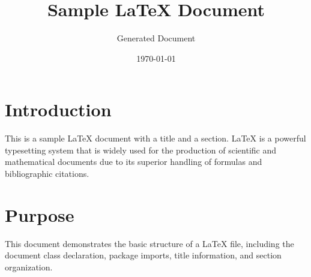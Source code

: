 \documentclass{article}
\title{Sample LaTeX Document}
\author{Generated Document}
\date{\today}
\begin{document}
\maketitle

\section{Introduction}
This is a sample LaTeX document with a title and a section. LaTeX is a powerful typesetting system that is widely used for the production of scientific and mathematical documents due to its superior handling of formulas and bibliographic citations.

\section{Purpose}
This document demonstrates the basic structure of a LaTeX file, including the document class declaration, package imports, title information, and section organization.
\end{document}
